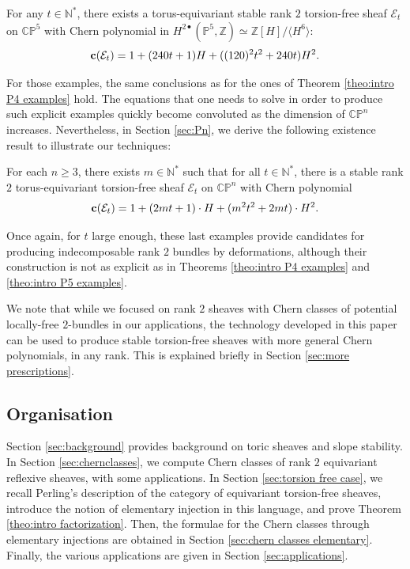 \documentclass[a4paper,10pt]{amsart}
\theoremstyle{plain}{
    \newtheorem{theorem}{Theorem}[section]
    \newtheorem{lemma}[theorem]{Lemma}
    \newtheorem{corollary}[theorem]{Corollary}
    \newtheorem{proposition}[theorem]{Proposition}
    \newtheorem{conjecture}[theorem]{Conjecture}
}
\theoremstyle{definition}{
    \newtheorem{definition}[theorem]{Definition}
    \newtheorem{defn-thm}[theorem]{Definition-Theorem}
    \newtheorem{example}[theorem]{Example}
    \newtheorem{notation}[theorem]{Notation}
}
\theoremstyle{remark}{
    \newtheorem{remark}[theorem]{Remark}
    \newtheorem{problem}[theorem]{Problem}
    \newtheorem{question}[theorem]{Question}
}
\def\uc{{\bf c}}
\def\cE{\mathcal{E}}
\def\Z{\mathbb{Z}}
\def\N{\mathbb{N}}
\def\P{\mathbb{P}}
\def\C{\mathbb{C}}
\begin{document}
\begin{theorem}
 \label{theo:intro P5 examples}
 For any $t\in\N^*$, there exists a torus-equivariant stable rank $2$ torsion-free sheaf $\cE_t$  on $\C\P^5$ with Chern polynomial in $H^{2\bullet}(\P^5,\Z)\simeq \Z[H]/\langle H^{6}\rangle$:
 $$\uc(\cE_t)=1+(240t+1) H+((120)^2t^2+240t) H^2.$$
\end{theorem}
For those examples, the same conclusions as for the ones of Theorem \ref{theo:intro P4 examples} hold. The equations that one needs to solve in order to produce such explicit examples quickly become convoluted as the dimension of $\C\P^n$ increases. Nevertheless, in Section \ref{sec:Pn}, we derive the following existence result to illustrate our techniques:
\begin{theorem}
 \label{theo:intro higher dim examples}
 For each $n\geq 3$, there exists $m\in\N^*$ such that for all $t\in\N^*$, there is a stable rank $2$ torus-equivariant torsion-free sheaf $\cE_t$ on $\C\P^n$ with Chern polynomial
 $$
 \uc(\cE_t)=1+(2mt+1)\cdot H+(m^2t^2+2mt)\cdot H^2.
 $$
\end{theorem}
Once again, for $t$ large enough, these last examples  provide candidates for producing indecomposable rank $2$ bundles by deformations, although their construction is not as explicit as in Theorems \ref{theo:intro P4 examples} and \ref{theo:intro P5 examples}. 
\begin{remark}
 \label{rem:intro more prescription pb}
We note that while we focused on rank $2$ sheaves with Chern classes of potential  locally-free $2$-bundles in our applications, the technology developed in this paper can be used to produce stable torsion-free sheaves with more general Chern polynomials, in any rank. This is explained briefly in Section \ref{sec:more prescriptions}.
\end{remark}


\subsection*{Organisation} Section \ref{sec:background} provides background on toric sheaves and slope stability. In Section \ref{sec:chernclasses}, we compute Chern classes of rank $2$ equivariant reflexive sheaves, with some applications.  In Section \ref{sec:torsion free case}, we recall Perling's description of the category of equivariant torsion-free sheaves, introduce the notion of elementary injection in this language, and prove Theorem \ref{theo:intro factorization}. Then, the formulae for the Chern classes through elementary injections are obtained in Section \ref{sec:chern classes elementary}. Finally, the various applications are given in Section \ref{sec:applications}.
\end{document}
